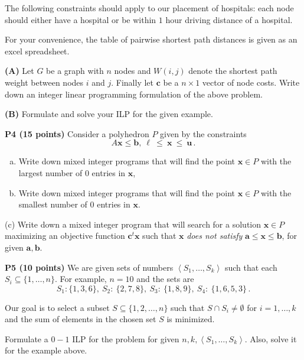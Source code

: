 \documentclass[11pt]{article}
\begin{document}
The following constraints should apply to our placement of hospitals:
each node should either have a hospital or be within $1$ hour driving
distance of a hospital.

For your convenience, the table of pairwise shortest path distances is given 
as an excel spreadsheet.

\noindent\textbf{(A)} Let $G$ be a graph with $n$ nodes
and $W(i,j)$ denote the shortest path weight between nodes $i$ and $j$.
Finally let $\mathbf{c}$ be a $n \times 1$ vector of node costs.
Write down an integer linear programming formulation of the above problem.

\noindent\textbf{(B)} Formulate and solve your ILP for the given example.

\medskip

\noindent\textbf{P4 (15 points)} Consider a polyhedron $P$ given
by the constraints
 \[ A \mathbf{x} \leq \mathbf{b},\ \mathbf{\ell}\ \leq\ \mathbf{x}\ \leq\ \mathbf{u}\,. \]


\begin{enumerate}[(a)]
\item  Write down mixed integer programs that will find the
point $\mathbf{x} \in P$ with the largest number of
$0$ entries in $\mathbf{x}$, 
\item Write down mixed integer programs that will find the
point $\mathbf{x} \in P$ with the smallest number of $0$ entries in $\mathbf{x}$.
\end{enumerate}

\noindent (c) Write down a mixed integer program that will search for a solution
$\mathbf{x} \in P$ maximizing an objective function $\mathbf{c}^t \mathbf{x}$ 
such that $\mathbf{x}$ \emph{does not satisfy}
$\mathbf{a} \leq \mathbf{x} \leq \mathbf{b}$, for given $\mathbf{a}, \mathbf{b}$.

\medskip

\noindent\textbf{P5 (10 points)} We are given  sets of numbers
$\left\langle{S_1,\ldots,S_k}\right\rangle$ such that each $S_i \subseteq \{1,\ldots, n\}$.
For example, $n = 10$ and the sets are
\[ S_1: \{ 1,3,6\},\ S_2:\ \{2, 7, 8\},\ S_3:\ \{1,8,9\},\ S_4:\ \{1,6,5,3\} \,.\]

Our goal is to select a subset $S \subseteq \{ 1, 2, \ldots, n\}$ such that 
$S \cap S_i \not= \emptyset$ for $i = 1,\ldots, k$ and the sum of elements
in the chosen set $S$ is minimized.

Formulate a $0-1$ ILP for the problem for given $n, k, \left\langle{S_1,\ldots,S_k}\right\rangle$. Also,
 solve it for the example above.
\end{document}
